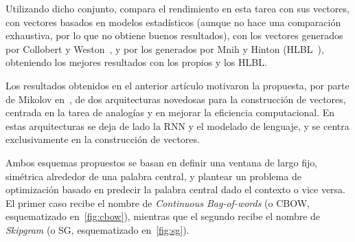 Utilizando dicho conjunto, compara el rendimiento en esta tarea con sus vectores, con vectores
basados en modelos estadísticos (aunque no hace una comparación exhaustiva, por lo que no obtiene
buenos resultados), con los vectores generados por Collobert y Weston~\cite{CollobertWeston2008}, y
por los generados por Mnih y Hinton (HLBL~\cite{MnihHinton2009}), obteniendo los mejores resultados
con los propios y los HLBL\@.

Los resultados obtenidos en el anterior artículo motivaron la propuesta, por parte de Mikolov
en~\cite{Mikolov2013b}, de dos arquitecturas novedosas para la construcción de vectores, centrada en
la tarea de analogías y en mejorar la eficiencia computacional. En estas arquitecturas se deja de
lado la RNN y el modelado de lenguaje, y se centra exclusivamente en la construcción de vectores.

Ambos esquemas propuestos se basan en definir una ventana de largo fijo, simétrica alrededor de una
palabra central, y plantear un problema de optimización basado en predecir la palabra central dado
el contexto o vice versa. El primer caso recibe el nombre de \textit{Continuous Bag-of-words} (o
CBOW, esquematizado en~\ref{fig:cbow}), mientras que el segundo recibe el nombre de
\textit{Skipgram} (o SG, esquematizado en~\ref{fig:sg}).

